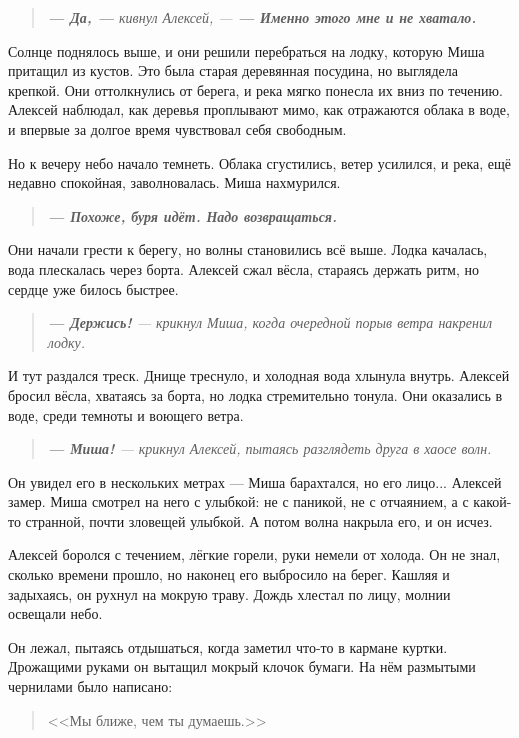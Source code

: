 \documentclass[12pt,a4paper]{book}
\newenvironment{dialogue}{\begin{quote}\itshape}{\end{quote}}
\begin{document}
\begin{dialogue}
\textbf{--- Да, ---} кивнул Алексей, --- \textbf{--- Именно этого мне и не хватало.}
\end{dialogue}

Солнце поднялось выше, и они решили перебраться на лодку, которую Миша притащил из кустов. Это была старая деревянная посудина, но выглядела крепкой. Они оттолкнулись от берега, и река мягко понесла их вниз по течению. Алексей наблюдал, как деревья проплывают мимо, как отражаются облака в воде, и впервые за долгое время чувствовал себя свободным.

Но к вечеру небо начало темнеть. Облака сгустились, ветер усилился, и река, ещё недавно спокойная, заволновалась. Миша нахмурился.

\begin{dialogue}
\textbf{--- Похоже, буря идёт. Надо возвращаться.}
\end{dialogue}

Они начали грести к берегу, но волны становились всё выше. Лодка качалась, вода плескалась через борта. Алексей сжал вёсла, стараясь держать ритм, но сердце уже билось быстрее.

\begin{dialogue}
\textbf{--- Держись!} --- крикнул Миша, когда очередной порыв ветра накренил лодку.
\end{dialogue}

И тут раздался треск. Днище треснуло, и холодная вода хлынула внутрь. Алексей бросил вёсла, хватаясь за борта, но лодка стремительно тонула. Они оказались в воде, среди темноты и воющего ветра.

\begin{dialogue}
\textbf{--- Миша!} --- крикнул Алексей, пытаясь разглядеть друга в хаосе волн.
\end{dialogue}

Он увидел его в нескольких метрах --- Миша барахтался, но его лицо... Алексей замер. Миша смотрел на него с улыбкой: не с паникой, не с отчаянием, а с какой-то странной, почти зловещей улыбкой. А потом волна накрыла его, и он исчез.

Алексей боролся с течением, лёгкие горели, руки немели от холода. Он не знал, сколько времени прошло, но наконец его выбросило на берег. Кашляя и задыхаясь, он рухнул на мокрую траву. Дождь хлестал по лицу, молнии освещали небо.

Он лежал, пытаясь отдышаться, когда заметил что-то в кармане куртки. Дрожащими руками он вытащил мокрый клочок бумаги. На нём размытыми чернилами было написано:
\begin{quote}
<<Мы ближе, чем ты думаешь.>>
\end{quote}
\end{document}
